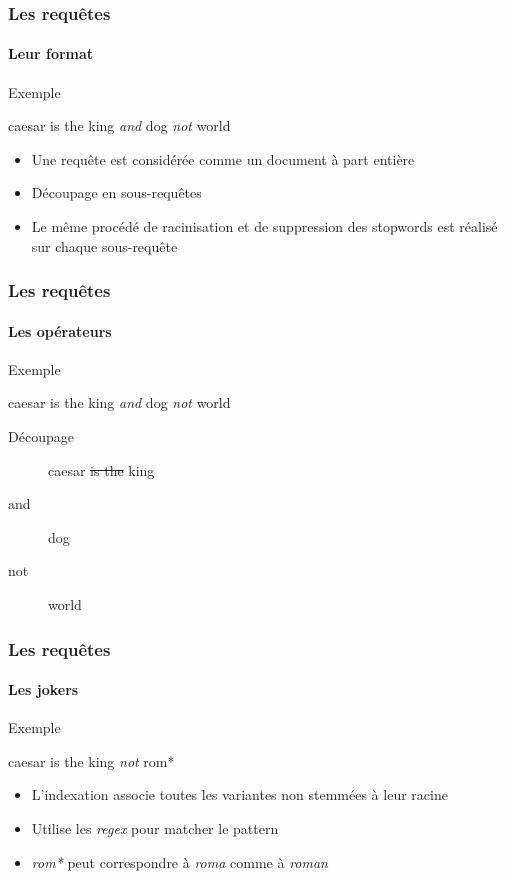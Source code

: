 \documentclass{beamer}
\begin{document}
\begin{frame}

\frametitle{Les requ\^etes}
\framesubtitle{Leur format}

\begin{exampleblock}{Exemple}

caesar is the king \textit{and} dog \textit{not} world

\end{exampleblock}

\begin{itemize}
 \item Une requ\^ete est consid\'er\'ee comme un document \`a part enti\`ere
 \item D\'ecoupage en sous-requ\^etes
 \item Le m\^eme proc\'ed\'e de racinisation et de suppression des stopwords est r\'ealis\'e sur chaque sous-requ\^ete
\end{itemize}


 
\end{frame}

\begin{frame}

\frametitle{Les requ\^etes}
\framesubtitle{Les op\'erateurs}

\begin{exampleblock}{Exemple}

caesar is the king \textit{and} dog \textit{not} world

\end{exampleblock}

\begin{exampleblock}{D\'ecoupage}

\begin{description}
\item[] caesar \sout{is the} king 
\item[and] dog 
\item[not] world
\end{description}


\end{exampleblock}

 
\end{frame}

\begin{frame}

\frametitle{Les requ\^etes}
\framesubtitle{Les jokers}

\begin{exampleblock}{Exemple}

caesar is the king \textit{not} rom*

\end{exampleblock}

\begin{itemize}
 \item L'indexation associe toutes les variantes non stemm\'ees \`a leur racine
 \item Utilise les \textit{regex} pour matcher le pattern
 \item \textit{rom*} peut correspondre \`a \textit{roma} comme \`a \textit{roman}
\end{itemize}

 
\end{frame}
\end{document}
